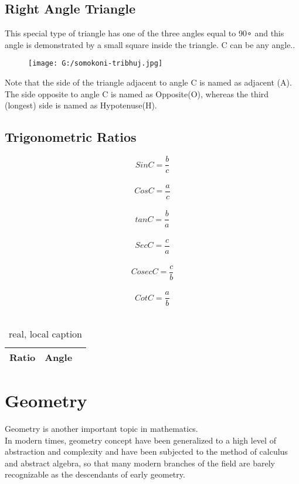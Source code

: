 \documentclass{article}
\begin{document}
\subsection{Right Angle Triangle}
This special type of triangle has one of the three angles equal to 90∘ and this angle is demonstrated by a small square inside the triangle. C can be any angle..
\begin{figure}[H]
\texttt{[image: G:/somokoni-tribhuj.jpg]}
\end{figure}
Note that the side of the triangle adjacent to angle C is named as adjacent (A). The side opposite to angle C is named as Opposite(O), whereas the third (longest) side is named as Hypotenuse(H).

\subsection{Trigonometric Ratios}
$$SinC=\frac{b}{c}$$\\
$$CosC=\frac{a}{c}$$\\
$$tanC=\frac{b}{a}$$\\
$$SecC=\frac{c}{a}$$\\
$$CosecC=\frac{c}{b}$$\\
$$CotC=\frac{a}{b}$$\\
\begin{table}
\centering
\caption[optional caption]{real, local caption}
\label{tab:tab1}
\begin{tabular}{l c r}
Ratio&Angle\\ \hline
\end{tabular}
\end{table}
\newpage
\section{Geometry}
Geometry is another important topic in mathematics.\\ In modern times, geometry concept have been generalized to a high level of abstraction and complexity and have been subjected to the method of calculus and abstract algebra, so that many modern branches of the field are barely recognizable as the descendants of early geometry.
\end{document}
